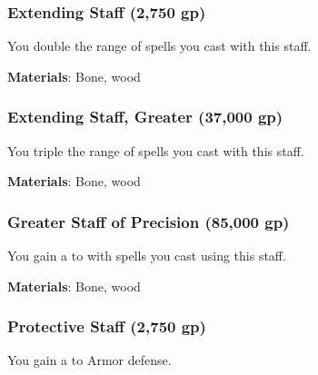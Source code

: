 
\lowercase{\hypertarget{item:Extending Staff}{}}\label{item:Extending Staff}
\hypertarget{item:Extending Staff}{\subsubsection{Extending Staff\hfill{} (2,750 gp)}}

You double the range of spells you cast with this staff.



\vspace{0.25em}
\textbf{Materials}: Bone, wood


\lowercase{\hypertarget{item:Extending Staff, Greater}{}}\label{item:Extending Staff, Greater}
\hypertarget{item:Extending Staff, Greater}{\subsubsection{Extending Staff, Greater\hfill{} (37,000 gp)}}

You triple the range of spells you cast with this staff.



\vspace{0.25em}
\textbf{Materials}: Bone, wood


\lowercase{\hypertarget{item:Greater Staff of Precision}{}}\label{item:Greater Staff of Precision}
\hypertarget{item:Greater Staff of Precision}{\subsubsection{Greater Staff of Precision\hfill{} (85,000 gp)}}

You gain a   to  with spells you cast using this staff.



\vspace{0.25em}
\textbf{Materials}: Bone, wood


\lowercase{\hypertarget{item:Protective Staff}{}}\label{item:Protective Staff}
\hypertarget{item:Protective Staff}{\subsubsection{Protective Staff\hfill{} (2,750 gp)}}

You gain a   to Armor defense.



